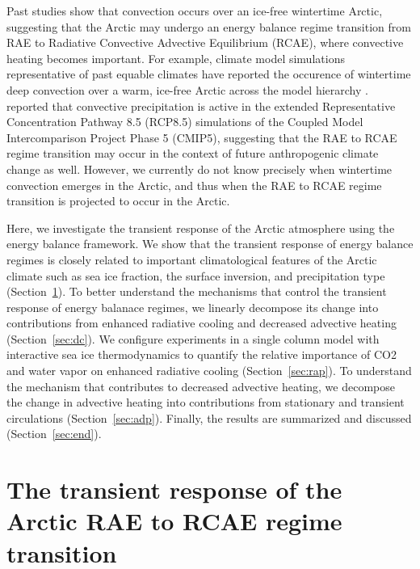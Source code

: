 \documentclass[draft]{agujournal2019}
\begin{document}
Past studies show that convection occurs over an ice-free wintertime Arctic, suggesting that the Arctic may undergo an energy balance regime transition from RAE to Radiative Convective Advective Equilibrium (RCAE), where convective heating becomes important. For example, climate model simulations representative of past equable climates have reported the occurence of wintertime deep convection over a warm, ice-free Arctic across the model hierarchy \cite{huber1999, abbot2008, abbot2008a, abbot2009, arnold2014}.  reported that convective precipitation is active in the extended Representative Concentration Pathway 8.5 (RCP8.5) simulations of the Coupled Model Intercomparison Project Phase 5 (CMIP5), suggesting that the RAE to RCAE regime transition may occur in the context of future anthropogenic climate change as well. However, we currently do not know precisely when wintertime convection emerges in the Arctic, and thus when the RAE to RCAE regime transition is projected to occur in the Arctic.

Here, we investigate the transient response of the Arctic atmosphere using the energy balance framework. We show that the transient response of energy balance regimes is closely related to important climatological features of the Arctic climate such as sea ice fraction, the surface inversion, and precipitation type (Section~\ref{sec:r1}). To better understand the mechanisms that control the transient response of energy balanace regimes, we linearly decompose its change into contributions from enhanced radiative cooling and decreased advective heating (Section~\ref{sec:dc}). We configure experiments in a single column model with interactive sea ice thermodynamics to quantify the relative importance of CO2 and water vapor on enhanced radiative cooling (Section~\ref{sec:rap}). To understand the mechanism that contributes to decreased advective heating, we decompose the change in advective heating into contributions from stationary and transient circulations (Section~\ref{sec:adp}). Finally, the results are summarized and discussed (Section~\ref{sec:end}).

\section{The transient response of the Arctic RAE to RCAE regime transition}
\label{sec:r1}
\end{document}
